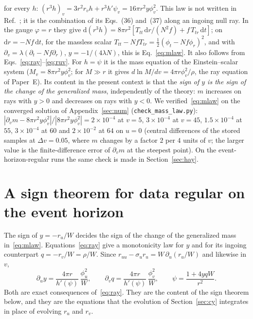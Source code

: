 \documentclass[11pt]{article}
\begin{document}
for every $h$: $(r^{3}h)_v=3r^{2}r_vh+r^{3}h'\psi_v=16\pi r^{2}y\phi_v^{2}$. This law is not written in Ref.~\cite{BuenoCanoHennigarMurcia2025}; it is the combination of its Eqs.~(36) and~(37) along an ingoing null ray. In the gauge $\varphi=r$ they give $\mathrm d(r^{3}h)=8\pi r^{2}[T_{tt}\,\mathrm dr/(N^{2}f)+f\,T_{tr}\,\mathrm dt]$; on $\mathrm dr=-Nf\,\mathrm dt$, for the massless scalar $T_{tt}-NfT_{tr}=\tfrac12(\phi_t-Nf\phi_r)^{2}$, and with $\partial_v=\lambda(\partial_t-Nf\partial_r)$, $y=-1/(4\lambda N)$, this is Eq.~\eqref{eq:mlaw}. It also follows from Eqs.~\eqref{eq:ray}--\eqref{eq:ruv}. For $h=\psi$ it is the mass equation of the Einstein--scalar system ($M_v=8\pi r^{2}y\phi_v^{2}$; for $M\gg r$ it gives $d\ln M/dv=4\pi r\phi_v^{2}/\rho$, the ray equation of Paper~E). Its content in the present context is that the \emph{sign of $y$ is the sign of the change of the generalized mass}, independently of the theory: $m$ increases on rays with $y>0$ and decreases on rays with $y<0$. We verified~\eqref{eq:mlaw} on the converged solution of Appendix~\ref{sec:num} (\texttt{check\_mass\_law.py}): $|\partial_vm-8\pi r^{2}y\phi_v^{2}|/|8\pi r^{2}y\phi_v^{2}|=2\times10^{-4}$ at $v=5$, $3\times10^{-4}$ at $v=45$, $1.5\times10^{-4}$ at $55$, $3\times10^{-4}$ at $60$ and $2\times10^{-2}$ at $64$ on $u=0$ (central differences of the stored samples at $\Delta v=0.05$, where $m$ changes by a factor $2$ per $4$ units of $v$; the larger value is the finite-difference error of $\partial_vm$ at the steepest point). On the event-horizon-regular runs the same check is made in Section~\ref{sec:hay}.

\section{A sign theorem for data regular on the event horizon}
\label{sec:prop}

The sign of $y=-r_u/W$ decides the sign of the change of the generalized mass in~\eqref{eq:mlaw}. Equations~\eqref{eq:ray} give a monotonicity law for $y$ and for its ingoing counterpart $q=-r_v/W=\rho/W$. Since $r_{uu}-\sigma_ur_u=W\,\partial_u(r_u/W)$ and likewise in $v$,
\begin{equation}
\partial_u y=\frac{4\pi r}{h'(\psi)}\,\frac{\phi_u^{2}}{W},\qquad
\partial_v q=\frac{4\pi r}{h'(\psi)}\,\frac{\phi_v^{2}}{W},\qquad
\psi=\frac{1+4yqW}{r^{2}} .
\label{eq:yq}
\end{equation}
Both are exact consequences of~\eqref{eq:ray}. They are the content of the sign theorem below, and they are the equations that the evolution of Section~\ref{sec:cy} integrates in place of evolving $r_u$ and $r_v$.
\end{document}
